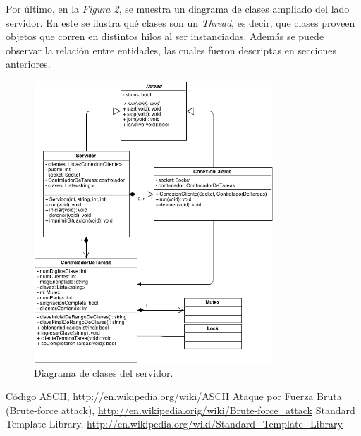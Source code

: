 \documentclass{article}
\begin{document}
	
	Por último, en la \textit{Figura 2}, se muestra un diagrama de clases ampliado del lado servidor. En este se ilustra qué clases son un \textit{Thread}, es decir, que clases proveen objetos que corren en distintos hilos al ser instanciadas. Además se puede observar la relación entre entidades, las cuales fueron descriptas en secciones anteriores.

\newpage
\begin{figure}[h]
	\centering
	\includegraphics[width=0.8\textwidth]{images/diagrama_p2.png}
	\medskip
	\caption{Diagrama de clases del servidor.}
\end{figure}
\bigskip\bigskip\bigskip\bigskip




\begin{thebibliography}{99}

	 Código ASCII, \url{http://en.wikipedia.org/wiki/ASCII}
	 Ataque por Fuerza Bruta (Brute-force attack), \url{http://en.wikipedia.orig/wiki/Brute-force_attack}
	 Standard Template Library, \url{http://en.wikipedia.org/wiki/Standard_Template_Library}
	\end{thebibliography}
\end{document}
